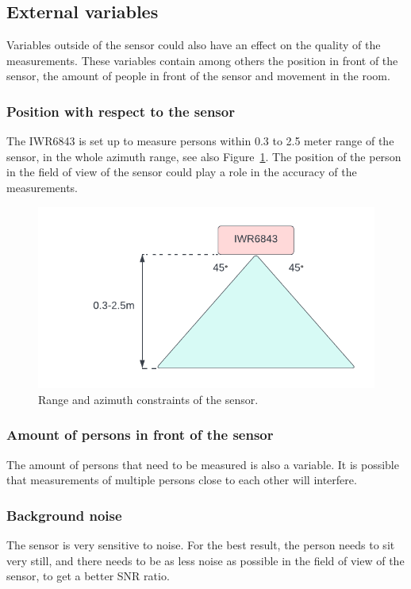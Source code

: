 \subsection{External variables}
Variables outside of the sensor could also have an effect on the quality of the measurements. These variables contain among others the position in front of the sensor, the amount of people in front of the sensor and movement in the room.

\subsubsection{Position with respect to the sensor}
The IWR6843 is set up to measure persons within 0.3 to 2.5 meter range of the sensor, in the whole azimuth range, see also Figure~\ref{fig:range_metric}. The position of the person in the field of view of the sensor could play a role in the accuracy of the measurements.

\begin{figure}[t]
    \centering
    \includegraphics[width=.6\textwidth]{figures/validation/range_metric.pdf}
    \caption{Range and azimuth constraints of the sensor.}
    \label{fig:range_metric}
\end{figure}

\subsubsection{Amount of persons in front of the sensor}
The amount of persons that need to be measured is also a variable. It is possible that measurements of multiple persons close to each other will interfere.

\subsubsection{Background noise}
The sensor is very sensitive to noise. For the best result, the person needs to sit very still, and there needs to be as less noise as possible in the field of view of the sensor, to get a better SNR ratio.

